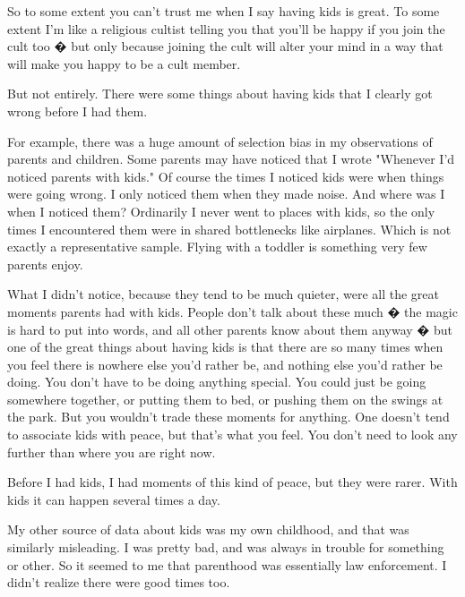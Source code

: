 So
                  to some extent you can't trust me when I say having kids is
                  great. To some extent I'm like a religious cultist telling you
                  that you'll be happy if you join the cult too � but only
                  because joining the cult will alter your mind in a way that
                  will make you happy to be a cult member.

But not
                  entirely. There were some things about having kids that I
                  clearly got wrong before I had them.

For example,
                  there was a huge amount of selection bias in my observations
                  of parents and children. Some parents may have noticed that I
                  wrote "Whenever I'd noticed parents with kids." Of course the
                  times I noticed kids were when things were going wrong. I only
                  noticed them when they made noise. And where was I when I
                  noticed them? Ordinarily I never went to places with kids, so
                  the only times I encountered them were in shared bottlenecks
                  like airplanes. Which is not exactly a representative sample.
                  Flying with a toddler is something very few parents enjoy.

What
                  I didn't notice, because they tend to be much quieter, were
                  all the great moments parents had with kids. People don't talk
                  about these much � the magic is hard to put into words, and
                  all other parents know about them anyway � but one of the
                  great things about having kids is that there are so many times
                  when you feel there is nowhere else you'd rather be, and
                  nothing else you'd rather be doing. You don't have to be doing
                  anything special. You could just be going somewhere together,
                  or putting them to bed, or pushing them on the swings at the
                  park. But you wouldn't trade these moments for anything. One
                  doesn't tend to associate kids with peace, but that's what you
                  feel. You don't need to look any further than where you are
                  right now.

Before I had kids, I had moments of this
                  kind of peace, but they were rarer. With kids it can happen
                  several times a day.

My other source of data about
                  kids was my own childhood, and that was similarly misleading.
                  I was pretty bad, and was always in trouble for something or
                  other. So it seemed to me that parenthood was essentially law
                  enforcement. I didn't realize there were good times too.

